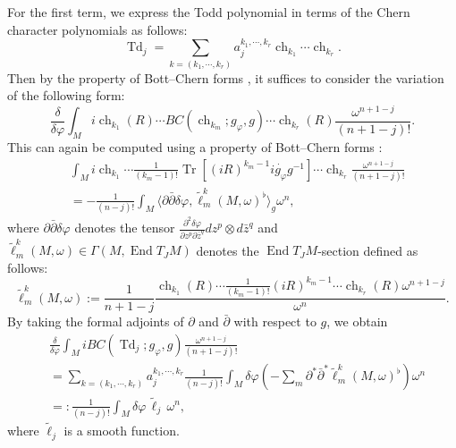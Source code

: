 \documentclass[12pt,reqno,a4paper]{amsart}
\numberwithin{equation}{section}
\DeclareMathOperator{\Td}{Td}
\DeclareMathOperator{\ch}{ch}
\DeclareMathOperator{\Tr}{Tr}
\DeclareMathOperator{\End}{End}
\theoremstyle{definition}
\theoremstyle{remark}
\begin{document}
For the first term, we express the Todd polynomial in terms of the Chern character polynomials as follows:
\begin{equation*}
\Td_j=\sum_{k=(k_1,\cdots,k_r)}a_j^{k_1,\cdots,k_r}\ch_{k_1}\cdots\ch_{k_r}.
\end{equation*}
Then by the property of Bott--Chern forms \cite[Proposition 1.2 (3)]{tian1999bott}, it suffices to consider the variation of the following form:
\begin{equation*}
\frac{\delta}{\delta\varphi} \int_M i\ch_{k_1}(R)\cdots BC(\ch_{k_m};g_{\varphi},g)\cdots\ch_{k_r}(R)\frac{\omega^{n+1-j}}{(n+1-j)!}.
\end{equation*}
This can again be computed using a property of Bott--Chern forms \cite[Proposition 1.2 (4)]{tian1999bott}:
\begin{align*}
&\int_M i\ch_{k_1}\cdots \frac{1}{(k_m-1)!}\Tr \left[ (iR)^{k_m-1}i\dot{g_\varphi}g^{-1} \right] \cdots\ch_{k_r}\frac{\omega^{n+1-j}}{(n+1-j)!}\\
&=-\frac{1}{(n-j)!}\int_M \langle \partial\bar{\partial}\delta\varphi, \widetilde{\ell}^k_m(M, \omega)^\flat\rangle_g \omega^n,
\end{align*}
where $\partial\bar{\partial}\delta\varphi$ denotes the tensor $\frac{\partial^2 \delta\varphi }{\partial z^p\partial \bar{z}^q}dz^p\otimes d\bar{z}^q$ and $\widetilde{\ell}^k_m(M, \omega)\in\Gamma(M,\End T_J M)$ denotes the $\End T_J M$-section defined as follows:
\begin{equation*}
\widetilde{\ell}^k_m(M, \omega):=\frac{1}{n+1-j}\frac{\ch_{k_1}(R)\cdots \frac{1}{(k_m-1)!}(iR)^{k_m-1}\cdots\ch_{k_r}(R)\omega^{n+1-j}}{\omega^n}.
\end{equation*}
By taking the formal adjoints of $\partial$ and $\bar{\partial}$ with respect to $g$, we obtain
\begin{align*}
&\frac{\delta}{\delta\varphi} \int_M iBC(\Td_j;g_{\varphi},g)\frac{\omega^{n+1-j}}{(n+1-j)!}\\
&=\sum_{k=(k_1,\cdots,k_r)}a_j^{k_1,\cdots,k_r} \frac{1}{(n-j)!}\int_M \delta\varphi (-\sum_m \partial^* \bar{\partial}^*\widetilde{\ell}^k_m(M, \omega)^\flat)\omega^n\\
&=:\frac{1}{(n-j)!}\int_M \delta\varphi \,\widetilde{\ell}_j\, \omega^n,
\end{align*}
where $\widetilde{\ell}_j$ is a smooth function. 
\end{document}
